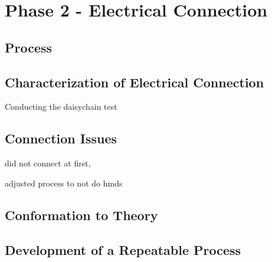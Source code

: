 \chapter{Phase 2 - Electrical Connection}

\section{Process}

\section{Characterization of Electrical Connection}
Conducting the daisychain test

\section{Connection Issues}
did not connect at first,

adjusted process to not do hmds

\section{Conformation to Theory}
\section{Development of a Repeatable Process}
